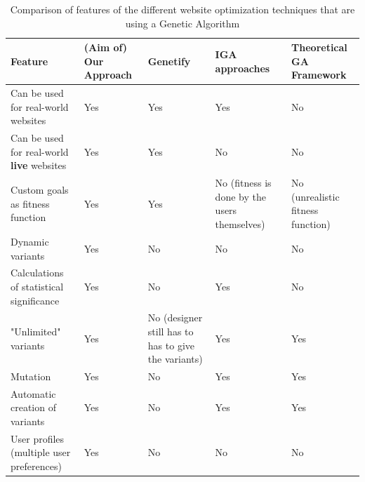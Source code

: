 \documentclass{report}
\begin{document}
\begin{table}[h]
	
	\hskip-3.0cm
	\begin{tabular}{|p{3cm}|p{3.5cm}|p{3.5cm}|p{3.5cm}|p{3.5cm}|}
		\hline
		\textbf{Feature}                                  & \textbf{(Aim of) Our Approach} & \textbf{Genetify}                                   & \textbf{IGA approaches}                      & \textbf{Theoretical GA Framework} \\ \hline
		    
		Can be used for real-world websites               & Yes                            & Yes                                                 & Yes                                          & No                                \\ \hline
		Can be used for real-world \textbf{live} websites & Yes                            & Yes                                                 & No                                           & No                                \\ \hline
		Custom goals as fitness function                  & Yes                            & Yes                                                 & No (fitness is done by the users themselves) & No (unrealistic fitness function) \\ \hline
		Dynamic variants                                  & Yes                            & No                                                  & No                                           & No                                \\ \hline
		Calculations of statistical significance          & Yes                            & No                                                  & Yes                                          & No                                \\ \hline
		   
		"Unlimited" variants                              & Yes                            & No (designer still has to has to give the variants) & Yes                                          & Yes                               \\ \hline
		Mutation                                          & Yes                            & No                                                  & Yes                                          & Yes                               \\ \hline
		Automatic creation of variants                    & Yes                            & No                                                  & Yes                                          & Yes                               \\ \hline
		User profiles (multiple user preferences)         & Yes                            & No                                                  & No                                           & No                                \\ \hline
		
	\end{tabular}
	\caption {Comparison of features of the different website optimization techniques that are using a Genetic Algorithm}
	\label{tab:cfg}
\end{table}
\FloatBarrier
\end{document}
